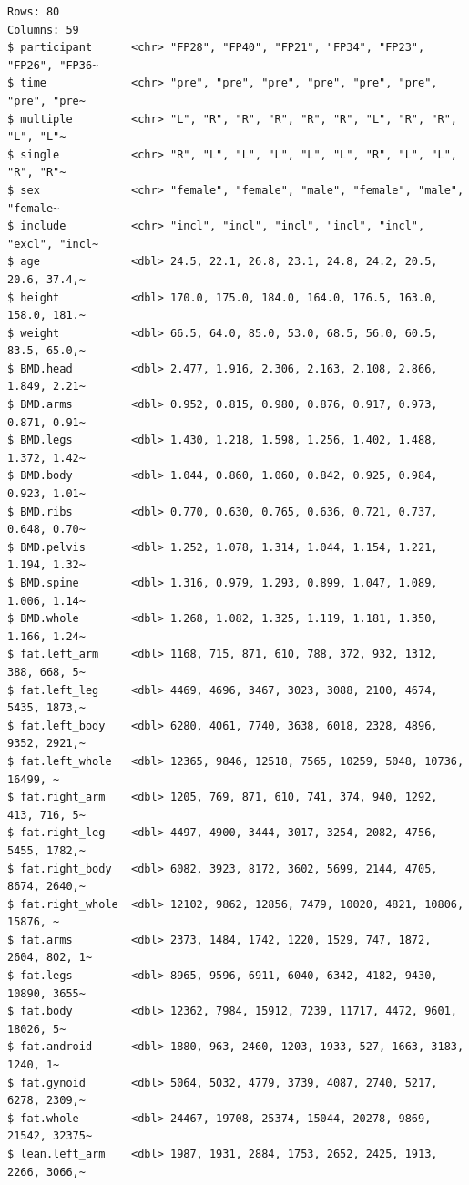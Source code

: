 \documentclass[
  11pt,
  letterpaper,
]{scrbook}
\begin{document}
\begin{verbatim}
Rows: 80
Columns: 59
$ participant      <chr> "FP28", "FP40", "FP21", "FP34", "FP23", "FP26", "FP36~
$ time             <chr> "pre", "pre", "pre", "pre", "pre", "pre", "pre", "pre~
$ multiple         <chr> "L", "R", "R", "R", "R", "R", "L", "R", "R", "L", "L"~
$ single           <chr> "R", "L", "L", "L", "L", "L", "R", "L", "L", "R", "R"~
$ sex              <chr> "female", "female", "male", "female", "male", "female~
$ include          <chr> "incl", "incl", "incl", "incl", "incl", "excl", "incl~
$ age              <dbl> 24.5, 22.1, 26.8, 23.1, 24.8, 24.2, 20.5, 20.6, 37.4,~
$ height           <dbl> 170.0, 175.0, 184.0, 164.0, 176.5, 163.0, 158.0, 181.~
$ weight           <dbl> 66.5, 64.0, 85.0, 53.0, 68.5, 56.0, 60.5, 83.5, 65.0,~
$ BMD.head         <dbl> 2.477, 1.916, 2.306, 2.163, 2.108, 2.866, 1.849, 2.21~
$ BMD.arms         <dbl> 0.952, 0.815, 0.980, 0.876, 0.917, 0.973, 0.871, 0.91~
$ BMD.legs         <dbl> 1.430, 1.218, 1.598, 1.256, 1.402, 1.488, 1.372, 1.42~
$ BMD.body         <dbl> 1.044, 0.860, 1.060, 0.842, 0.925, 0.984, 0.923, 1.01~
$ BMD.ribs         <dbl> 0.770, 0.630, 0.765, 0.636, 0.721, 0.737, 0.648, 0.70~
$ BMD.pelvis       <dbl> 1.252, 1.078, 1.314, 1.044, 1.154, 1.221, 1.194, 1.32~
$ BMD.spine        <dbl> 1.316, 0.979, 1.293, 0.899, 1.047, 1.089, 1.006, 1.14~
$ BMD.whole        <dbl> 1.268, 1.082, 1.325, 1.119, 1.181, 1.350, 1.166, 1.24~
$ fat.left_arm     <dbl> 1168, 715, 871, 610, 788, 372, 932, 1312, 388, 668, 5~
$ fat.left_leg     <dbl> 4469, 4696, 3467, 3023, 3088, 2100, 4674, 5435, 1873,~
$ fat.left_body    <dbl> 6280, 4061, 7740, 3638, 6018, 2328, 4896, 9352, 2921,~
$ fat.left_whole   <dbl> 12365, 9846, 12518, 7565, 10259, 5048, 10736, 16499, ~
$ fat.right_arm    <dbl> 1205, 769, 871, 610, 741, 374, 940, 1292, 413, 716, 5~
$ fat.right_leg    <dbl> 4497, 4900, 3444, 3017, 3254, 2082, 4756, 5455, 1782,~
$ fat.right_body   <dbl> 6082, 3923, 8172, 3602, 5699, 2144, 4705, 8674, 2640,~
$ fat.right_whole  <dbl> 12102, 9862, 12856, 7479, 10020, 4821, 10806, 15876, ~
$ fat.arms         <dbl> 2373, 1484, 1742, 1220, 1529, 747, 1872, 2604, 802, 1~
$ fat.legs         <dbl> 8965, 9596, 6911, 6040, 6342, 4182, 9430, 10890, 3655~
$ fat.body         <dbl> 12362, 7984, 15912, 7239, 11717, 4472, 9601, 18026, 5~
$ fat.android      <dbl> 1880, 963, 2460, 1203, 1933, 527, 1663, 3183, 1240, 1~
$ fat.gynoid       <dbl> 5064, 5032, 4779, 3739, 4087, 2740, 5217, 6278, 2309,~
$ fat.whole        <dbl> 24467, 19708, 25374, 15044, 20278, 9869, 21542, 32375~
$ lean.left_arm    <dbl> 1987, 1931, 2884, 1753, 2652, 2425, 1913, 2266, 3066,~

\end{verbatim}
\end{document}
